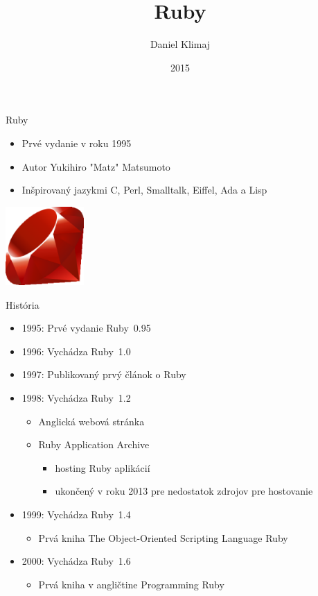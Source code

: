 \documentclass[pdf,slideColor,fyma]{prosper}
\title{\Large Ruby}
\author{Daniel Klimaj}
\date{2015}
\begin{document}
\maketitle

\begin{slide}{Ruby}
\begin{itemize}
  \item{Prvé vydanie v roku 1995}
\end{itemize}
\begin{itemize}
  \item{Autor  Yukihiro "Matz" Matsumoto}
\end{itemize}
\begin{itemize}
  \item{Inšpirovaný jazykmi C, Perl, Smalltalk, Eiffel, Ada a Lisp}
\end{itemize}
\begin{center}
  \includegraphics[width=3cm]{ruby.eps}
\end{center}
\end{slide}

\begin{slide}{História}
\begin{itemize}
  \item{1995: Prvé vydanie Ruby~0.95}
  \item{1996: Vychádza Ruby~1.0}
  \item{1997: Publikovaný prvý článok o Ruby}
  \item{1998: Vychádza Ruby~1.2}
  \begin{itemize}
    \item{Anglická webová stránka}
    \item{Ruby Application Archive}
    \begin{itemize}
      \item{hosting Ruby aplikácií}
      \item{ukončený v roku 2013 pre nedostatok zdrojov pre hostovanie}
    \end{itemize}
  \end{itemize}
  \item{1999: Vychádza Ruby~1.4}
  \begin{itemize}
    \item{Prvá kniha The Object-Oriented Scripting Language Ruby}
  \end{itemize}
  \item{2000: Vychádza Ruby~1.6}
  \begin{itemize}
    \item{Prvá kniha v angličtine Programming Ruby}
  \end{itemize}
\end{itemize}
\end{slide}
\end{document}
